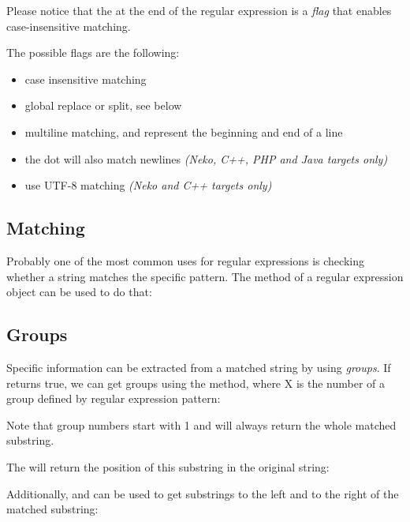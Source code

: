 Please notice that the  at the end of the regular expression is a \emph{flag} that enables case-insensitive matching.

The possible flags are the following:
\begin{itemize}
	\item {} case insensitive matching
	\item {} global replace or split, see below
	\item {} multiline matching, \expr{\textasciicircum} and \expr{\$} represent the beginning and end of a line
	\item {} the dot  will also match newlines \emph{(Neko, C++, PHP and Java targets only)}
	\item {} use UTF-8 matching \emph{(Neko and C++ targets only)}
\end{itemize}

\subsection{Matching}
\label{std-regex-match}

Probably one of the most common uses for regular expressions is checking whether a string matches the specific pattern. The  method of a regular expression object can be used to do that:

\subsection{Groups}
\label{std-regex-groups}

Specific information can be extracted from a matched string by using \emph{groups}. If  returns true, we can get groups using the  method, where X is the number of a group defined by regular expression pattern:


Note that group numbers start with 1 and  will always return the whole matched substring.

The  will return the position of this substring in the original string:


Additionally,  and  can be used to get substrings to the left and to the right of the matched substring:


